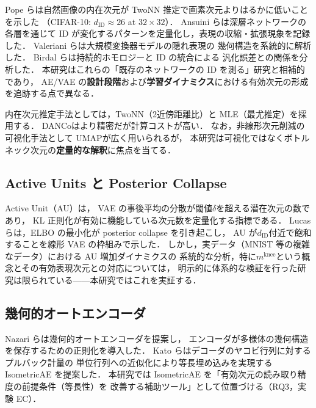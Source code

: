 \documentclass[11pt,a4paper]{jsarticle}
\newcommand{\mknee}{m^{\mathrm{knee}}}
\begin{document}
Pope ら\cite{pope2021intrinsic}は自然画像の内在次元が
TwoNN 推定で画素次元よりはるかに低いことを示した
（CIFAR-10: $d_\mathrm{ID} \approx 26$ at $32 \times 32$）．
Ansuini ら\cite{ansuini2019intrinsic}は深層ネットワークの各層を通じて
ID が変化するパターンを定量化し，表現の収縮・拡張現象を記録した．
Valeriani ら\cite{valeriani2023geometry}は大規模変換器モデルの隠れ表現の
幾何構造を系統的に解析した．
Birdal ら\cite{birdal2021intrinsic}は持続的ホモロジーと ID の統合による
汎化誤差との関係を分析した．
本研究はこれらの「既存のネットワークの ID を測る」研究と相補的であり，
AE/VAE の\textbf{設計段階}および\textbf{学習ダイナミクス}における有効次元の形成を追跡する点で異なる．

内在次元推定手法としては，TwoNN\cite{facco2017twonn}（2近傍距離比）と
MLE\cite{levina2005mle}（最尤推定）を採用する．
DANCo\cite{ceruti2014danco}はより精密だが計算コストが高い．
なお，非線形次元削減の可視化手法として UMAP\cite{mcinnes2018umap}が広く用いられるが，
本研究は可視化ではなくボトルネック次元の\textbf{定量的な解釈}に焦点を当てる．

\subsection{Active Units と Posterior Collapse}\label{sec:related_au}

Active Unit（AU）\cite{lucas2019elbo,higgins2017betavae}は，
VAE の事後平均の分散が閾値$\delta$を超える潜在次元の数であり，
KL 正則化が有効に機能している次元数を定量化する指標である．
Lucas ら\cite{lucas2019elbo}は，ELBO の最小化が posterior collapse を引き起こし，
AU が$d_{\mathrm{ID}}$付近で飽和することを線形 VAE の枠組みで示した．
しかし，実データ（MNIST 等の複雑なデータ）における AU 増加ダイナミクスの
系統的な分析，特に$\mknee$という概念とその有効表現次元との対応については，
明示的に体系的な検証を行った研究は限られている——本研究ではこれを実証する．

\subsection{幾何的オートエンコーダ}\label{sec:related_geo}

Nazari ら\cite{nazari2023geometric}は幾何的オートエンコーダを提案し，
エンコーダが多様体の幾何構造を保存するための正則化を導入した．
Kato ら\cite{kato2020rdae}はデコーダのヤコビ行列に対するプルバック計量の
単位行列への近似化により等長埋め込みを実現する IsometricAE を提案した．
本研究では IsometricAE を「有効次元の読み取り精度の前提条件（等長性）を
改善する補助ツール」として位置づける（RQ3，実験 EC）．
\end{document}
